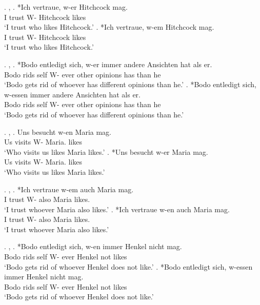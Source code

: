 \ex. , 
\ag. *Ich vertraue, w-er Hitchcock mag.\\
 I trust\scsub{[dat]} W- Hitchcock likes\scsub{[nom]}\\
 `I trust who likes Hitchcock.' \hfill \citep[345]{vogel2001}
\bg. *Ich vertraue, w-em Hitchcock mag.\\
 I trust\scsub{[dat]} W- Hitchcock likes\scsub{[nom]}\\
 `I trust who likes Hitchcock.' \hfill \citep[345]{vogel2001}

\ex. , 
\ag. *Bodo entledigt sich, w-er immer andere Ansichten hat als er.\\
 Bodo rids\scsub{[gen]} self W- ever other opinions has\scsub{[nom]} than he\\
 `Bodo gets rid of whoever has different opinions than he.' \hfill \citep[345]{vogel2001}
\bg. *Bodo entledigt sich, w-essen immer andere Ansichten hat als er.\\
 Bodo rids\scsub{[gen]} self  W- ever other opinions has\scsub{[nom]} than he\\
 `Bodo gets rid of whoever has different opinions than he.' \hfill \citep[345]{vogel2001}

\ex. , 
\ag. Uns besucht w-en Maria mag.\\
 Us visits\scsub{[nom]} W- Maria. likes\scsub{[acc]}\\
 `Who visits us likes Maria likes.' \hfill \citep[343]{vogel2001}
\bg. *Uns besucht w-er Maria mag.\\
 Us visits\scsub{[nom]} W- Maria. likes\scsub{[acc]}\\
 `Who visits us likes Maria likes.' \hfill \citep[343]{vogel2001}

 \ex. , 
\ag. *Ich vertraue w-em auch Maria mag. \\
 I trust\scsub{[dat]} W- also Maria likes\scsub{[acc]}.\\
 `I trust whoever Maria also likes.' \hfill \citep[345]{vogel2001}
\bg. *Ich vertraue w-en auch Maria mag. \\
 I trust\scsub{[dat]} W- also Maria likes\scsub{[acc]}.\\
 `I trust whoever Maria also likes.' \hfill \citep[345]{vogel2001}

\ex. , 
\ag. *Bodo entledigt sich, w-en immer Henkel nicht mag.\\
 Bodo rids\scsub{[gen]} self W- ever Henkel not likes\scsub{[acc]}\\
 `Bodo gets rid of whoever Henkel does not like.' \hfill \citep[344]{vogel2001}
\bg. *Bodo entledigt sich, w-essen immer Henkel nicht mag.\\
 Bodo rids\scsub{[gen]} self  W- ever Henkel not likes\scsub{[acc]}\\
 `Bodo gets rid of whoever Henkel does not like.' \hfill \citep[344]{vogel2001}

